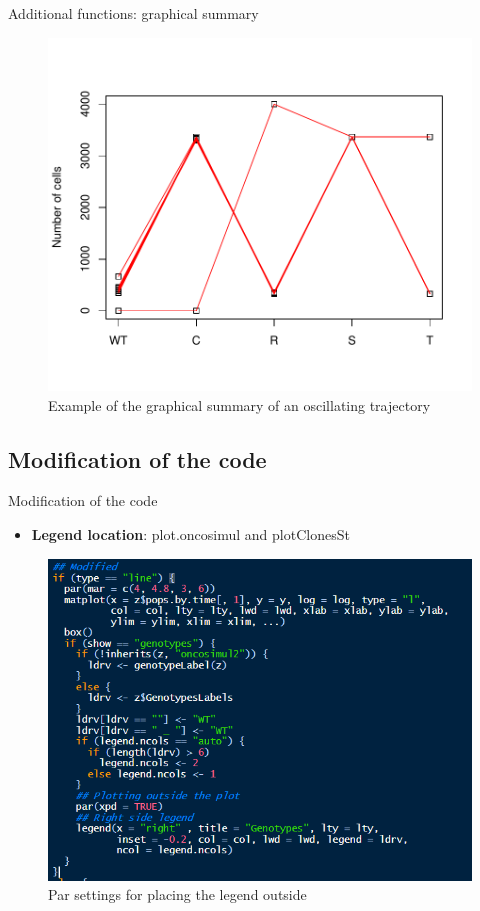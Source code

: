 \begin{frame}{Additional functions: graphical summary}
    \begin{figure}
    \centering
    \includegraphics[width=0.8\linewidth]{img/stripchart_example.pdf}
    \caption{Example of the graphical summary of an oscillating trajectory}
    \end{figure}
\end{frame}

\subsection{Modification of the code}

\begin{frame}{Modification of the code}
	\begin{itemize}
		\item \textbf{Legend location}: plot.oncosimul and plotClonesSt
	\end{itemize}
    \begin{figure}
    \centering
    \includegraphics[width=0.7\linewidth]{img/plot_legend_outside.PNG}
    \caption{Par settings for placing the legend outside}
    \end{figure}
\end{frame}


